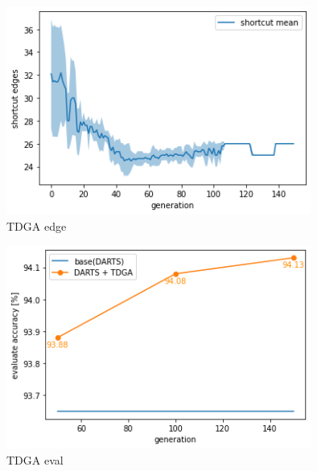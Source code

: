 \begin{figure}[t]
  \begin{center}
    \includegraphics[clip,width=10cm]{./fig/04.exp/edge_tdga.png}
  \end{center}
  \caption{TDGA edge}
  \label{fig:edge_tdga}
\end{figure}

\begin{figure}[t]
  \begin{center}
    \includegraphics[clip,width=10cm]{./fig/04.exp/eval_tdga.png}
  \end{center}
  \caption{TDGA eval}
  \label{fig:eval_tdga}
\end{figure}
